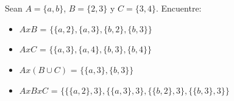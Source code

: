 \section{}
Sean $A = \{a, b \}$, $B = \{ 2, 3\}$ y $C = \{ 3, 4 \}$. Encuentre:
\begin{itemize}
	\item $AxB$ = $\{\{a,2\},\{a,3\},\{b,2\},\{b,3\}\}$
	\item $AxC$ = $\{\{a,3\},\{a,4\},\{b,3\},\{b,4\}\}$
	\item $A x (B \cup C)$ = $\{\{a,3\},\{b,3\}\}$ 
	\item $A x B x C$ = $\{\{\{a,2\},3\},\{\{a,3\},3\},\{\{b,2\},3\},\{\{b,3\},3\}\}$
\end{itemize}